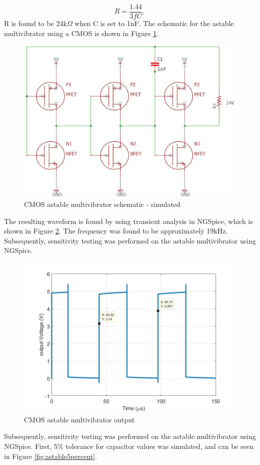 \begin{equation}
R = \frac{1.44}{3fC},
\label{eqn:Rastable}
\end{equation}
R is found to be 24k$\Omega$ when C is set to 1nF. The schematic for the astable multivibrator using a CMOS is shown in Figure \ref{fig:cmosaschtable}.

\begin{figure}[H]
    \centering
        \centering
        \includegraphics[scale = .35]{CircuitDevelopment/cd4007SIM/Aschtable.png}
        \caption{CMOS astable multivibrator schematic - simulated}
        \label{fig:cmosaschtable}
\end{figure} 
The resulting waveform is found by using transient analysis in NGSpice, which is shown in Figure \ref{fig:astablesingle}. The frequency was found to be approximately 19kHz. Subsequently, sensitivity testing was performed on the astable multivibrator using NGSpice.

\begin{figure}[H]
    \centering
        \centering
        \includegraphics[scale = .35]{CircuitDevelopment/cd4007SIM/astable_DC.jpg}
        \caption{CMOS astable multivibrator output }
        \label{fig:astablesingle}
\end{figure}
Subsequently, sensitivity testing was performed on the astable multivibrator using NGSpice. First, 5\% tolerance for capacitor values was simulated, and can be seen in Figure \ref{fig:astable5percent}.

